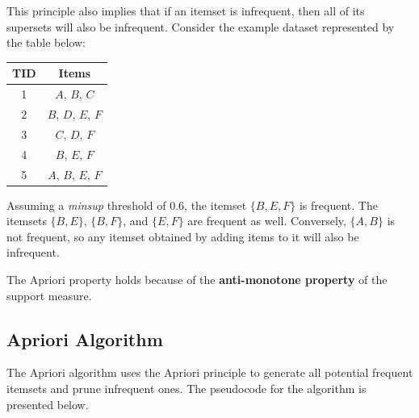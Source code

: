 
This principle also implies that if an itemset is infrequent, then all of its supersets will also be infrequent. Consider the example dataset represented by the table below:

\begin{table}[h]
    \centering
    \begin{tabular}{|c|c|}
    \hline
        TID & Items \\
    \hline
        1 & $A$, $B$, $C$ \\
    \hline
        2 & $B$, $D$, $E$, $F$ \\
    \hline
        3 & $C$, $D$, $F$ \\
    \hline
        4 & $B$, $E$, $F$ \\
    \hline
        5 & $A$, $B$, $E$, $F$ \\
    \hline
    \end{tabular}
\end{table}

Assuming a \textit{minsup} threshold of 0.6, the itemset $\{B,E,F\}$ is frequent. The itemsets $\{B,E\}$, $\{B,F\}$, and $\{E,F\}$ are frequent as well. Conversely, $\{A,B\}$ is not frequent, so any itemset obtained by adding items to it will also be infrequent.

The Apriori property holds because of the \textbf{anti-monotone property} of the support measure.


\subsection{Apriori Algorithm}

The Apriori algorithm uses the Apriori principle to generate all potential frequent itemsets and prune infrequent ones. The pseudocode for the algorithm is presented below.

